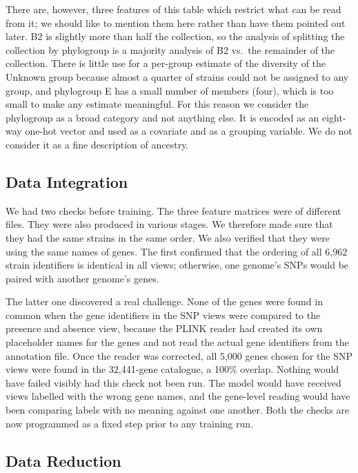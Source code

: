 \documentclass[journal]{IEEEtran}
\begin{document}
There are, however, three features of this table which restrict what can be read
from it; we should like to mention them here rather than have them pointed out
later. B2 is slightly more than half the collection, so the analysis of splitting
the collection by phylogroup is a majority analysis of B2 vs.\ the remainder of the
collection. There is little use for a per-group estimate of the diversity of the
Unknown group because almost a quarter of strains could not be assigned to any
group, and phylogroup E has a small number of members (four), which is too small to
make any estimate meaningful. For this reason we consider the phylogroup as a broad
category and not anything else. It is encoded as an eight-way one-hot vector and
used as a covariate and as a grouping variable. We do not consider it as a fine
description of ancestry.

\subsection{Data Integration}

We had two checks before training. The three feature matrices were of different
files. They were also produced in various stages. We therefore made sure that they
had the same strains in the same order. We also verified that they were using the
same names of genes. The first confirmed that the ordering of all 6,962 strain
identifiers is identical in all views; otherwise, one genome's SNPs would be paired
with another genome's genes.

The latter one discovered a real challenge. None of the genes were found in common
when the gene identifiers in the SNP views were compared to the presence and
absence view, because the PLINK reader had created its own placeholder names for the
genes and not read the actual gene identifiers from the annotation file. Once the
reader was corrected, all 5,000 genes chosen for the SNP views were found in the
32,441-gene catalogue, a 100\% overlap. Nothing would have failed visibly had
this check not been run. The model would have received views labelled with the wrong
gene names, and the gene-level reading would have been comparing labels with no
meaning against one another. Both the checks are now programmed as a fixed step
prior to any training run.

\subsection{Data Reduction}
\end{document}
